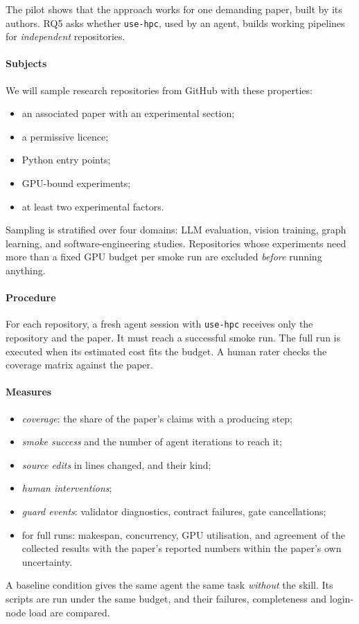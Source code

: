 \documentclass[pdflatex,sn-mathphys-num]{sn-jnl}
\theoremstyle{thmstyleone}%
\theoremstyle{thmstyletwo}%
\theoremstyle{thmstylethree}%
\newcommand{\skill}{\texttt{use-hpc}}
\begin{document}
The pilot shows that the approach works for one demanding paper, built by its
authors. RQ5 asks whether \skill{}, used by an agent, builds working pipelines
for \emph{independent} repositories.

\paragraph{Subjects} We will sample research repositories from GitHub with
these properties:
\begin{itemize}[leftmargin=1.4em, itemsep=1pt]
\item an associated paper with an experimental section;
\item a permissive licence;
\item Python entry points;
\item GPU-bound experiments;
\item at least two experimental factors.
\end{itemize}
Sampling is stratified over four domains: LLM evaluation, vision training,
graph learning, and software-engineering studies. Repositories whose
experiments need more than a fixed GPU budget per smoke run are excluded
\emph{before} running anything.

\paragraph{Procedure} For each repository, a fresh agent session with \skill{}
receives only the repository and the paper. It must reach a successful smoke
run. The full run is executed when its estimated cost fits the budget. A human
rater checks the coverage matrix against the paper.

\paragraph{Measures}
\begin{itemize}[leftmargin=1.4em, itemsep=1pt]
\item \emph{coverage}: the share of the paper's claims with a producing step;
\item \emph{smoke success} and the number of agent iterations to reach it;
\item \emph{source edits} in lines changed, and their kind;
\item \emph{human interventions};
\item \emph{guard events}: validator diagnostics, contract failures, gate
cancellations;
\item for full runs: makespan, concurrency, GPU utilisation, and agreement of
the collected results with the paper's reported numbers within the paper's
own uncertainty.
\end{itemize}
A baseline condition gives the same agent the same task \emph{without} the
skill. Its scripts are run under the same budget, and their failures,
completeness and login-node load are compared.
\end{document}
